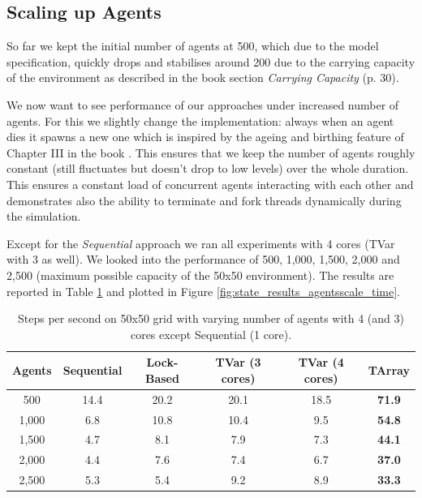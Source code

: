 \subsection{Scaling up Agents}
So far we kept the initial number of agents at 500, which due to the model specification, quickly drops and stabilises around 200 due to the carrying capacity of the environment as described in the book \cite{epstein_growing_1996} section \textit{Carrying Capacity} (p. 30).

We now want to see performance of our approaches under increased number of agents. For this we slightly change the implementation: always when an agent dies it spawns a new one which is inspired by the ageing and birthing feature of Chapter III in the book \cite{epstein_growing_1996}. This ensures that we keep the number of agents roughly constant (still fluctuates but doesn't drop to low levels) over the whole duration. This ensures a constant load of concurrent agents interacting with each other and demonstrates also the ability to terminate and fork threads dynamically during the simulation.

Except for the \textit{Sequential} approach we ran all experiments with 4 cores (TVar with 3 as well). We looked into the performance of 500, 1,000, 1,500, 2,000 and 2,500 (maximum possible capacity of the 50x50 environment). The results are reported in Table \ref{tab:state_results_agentsscale_time} and plotted in Figure \ref{fig:state_results_agentsscale_time}.

\begin{table}
	\centering
  	\begin{tabular}{ c || c | c | c | c | c }
        Agents  & Sequential & Lock-Based & TVar (3 cores) & TVar (4 cores) & TArray  \\ \hline \hline 
    	    500     & 14.4       & 20.2		  &	20.1           & 18.5       	& \textbf{71.9}    \\ \hline
   		1,000   & 6.8        & 10.8 	      & 10.4           & 9.5         & \textbf{54.8}    \\ \hline
   		1,500   & 4.7        & 8.1 		  & 7.9            & 7.3			& \textbf{44.1}    \\ \hline
   		2,000   & 4.4        & 7.6 		  & 7.4            & 6.7    		& \textbf{37.0}    \\ \hline 
   		2,500   & 5.3        & 5.4 		  & 9.2            & 8.9			& \textbf{33.3}    \\ \hline \hline
   	\end{tabular}
  	
  	\caption{Steps per second on 50x50 grid with varying number of agents with 4 (and 3) cores except Sequential (1 core).}
	\label{tab:state_results_agentsscale_time}
\end{table}

